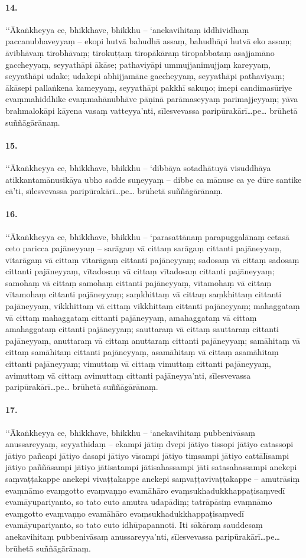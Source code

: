 \paragraph{14.} ‘‘Ākaṅkheyya ce, bhikkhave, bhikkhu – ‘anekavihitaṃ iddhividhaṃ paccanubhaveyyaṃ – ekopi hutvā bahudhā assaṃ, bahudhāpi hutvā eko assaṃ; āvibhāvaṃ tirobhāvaṃ; tirokuṭṭaṃ tiropākāraṃ tiropabbataṃ asajjamāno gaccheyyaṃ, seyyathāpi ākāse; pathaviyāpi ummujjanimujjaṃ kareyyaṃ, seyyathāpi udake; udakepi abhijjamāne gaccheyyaṃ, seyyathāpi pathaviyaṃ; ākāsepi pallaṅkena kameyyaṃ, seyyathāpi pakkhī sakuṇo; imepi candimasūriye evaṃmahiddhike evaṃmahānubhāve pāṇinā parāmaseyyaṃ parimajjeyyaṃ; yāva brahmalokāpi kāyena vasaṃ vatteyya’nti, sīlesvevassa paripūrakārī…pe… brūhetā suññāgārānaṃ.

\paragraph{15.} ‘‘Ākaṅkheyya ce, bhikkhave, bhikkhu – ‘dibbāya sotadhātuyā visuddhāya atikkantamānusikāya ubho sadde suṇeyyaṃ – dibbe ca mānuse ca ye dūre santike cā’ti, sīlesvevassa paripūrakārī…pe… brūhetā suññāgārānaṃ.

\paragraph{16.} ‘‘Ākaṅkheyya ce, bhikkhave, bhikkhu – ‘parasattānaṃ parapuggalānaṃ cetasā ceto paricca pajāneyyaṃ – sarāgaṃ vā cittaṃ sarāgaṃ cittanti pajāneyyaṃ, vītarāgaṃ vā cittaṃ vītarāgaṃ cittanti pajāneyyaṃ; sadosaṃ vā cittaṃ sadosaṃ cittanti pajāneyyaṃ, vītadosaṃ vā cittaṃ vītadosaṃ cittanti pajāneyyaṃ; samohaṃ vā cittaṃ samohaṃ cittanti pajāneyyaṃ, vītamohaṃ vā cittaṃ vītamohaṃ cittanti pajāneyyaṃ; saṃkhittaṃ vā cittaṃ saṃkhittaṃ cittanti pajāneyyaṃ, vikkhittaṃ vā cittaṃ vikkhittaṃ cittanti pajāneyyaṃ; mahaggataṃ vā cittaṃ mahaggataṃ cittanti pajāneyyaṃ, amahaggataṃ vā cittaṃ amahaggataṃ cittanti pajāneyyaṃ; sauttaraṃ vā cittaṃ sauttaraṃ cittanti pajāneyyaṃ, anuttaraṃ vā cittaṃ anuttaraṃ cittanti pajāneyyaṃ; samāhitaṃ vā cittaṃ samāhitaṃ cittanti pajāneyyaṃ, asamāhitaṃ vā cittaṃ asamāhitaṃ cittanti pajāneyyaṃ; vimuttaṃ vā cittaṃ vimuttaṃ cittanti pajāneyyaṃ, avimuttaṃ vā cittaṃ avimuttaṃ cittanti pajāneyya’nti, sīlesvevassa paripūrakārī…pe… brūhetā suññāgārānaṃ.

\paragraph{17.} ‘‘Ākaṅkheyya ce, bhikkhave, bhikkhu – ‘anekavihitaṃ pubbenivāsaṃ anussareyyaṃ, seyyathidaṃ – ekampi jātiṃ dvepi jātiyo tissopi jātiyo catassopi jātiyo pañcapi jātiyo dasapi jātiyo vīsampi jātiyo tiṃsampi jātiyo cattālīsampi jātiyo paññāsampi jātiyo jātisatampi jātisahassampi jāti satasahassampi anekepi saṃvaṭṭakappe anekepi vivaṭṭakappe anekepi saṃvaṭṭavivaṭṭakappe – amutrāsiṃ evaṃnāmo evaṃgotto evaṃvaṇṇo evamāhāro evaṃsukhadukkhappaṭisaṃvedī evamāyupariyanto, so tato cuto amutra udapādiṃ; tatrāpāsiṃ evaṃnāmo evaṃgotto evaṃvaṇṇo evamāhāro evaṃsukhadukkhappaṭisaṃvedī evamāyupariyanto, so tato cuto idhūpapannoti. Iti sākāraṃ sauddesaṃ anekavihitaṃ pubbenivāsaṃ anussareyya’nti, sīlesvevassa paripūrakārī…pe… brūhetā suññāgārānaṃ.

